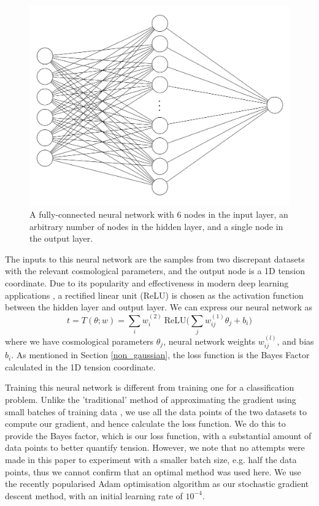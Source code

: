 \documentclass[%
 reprint,
 amsmath,amssymb,
 aps,
]{revtex4-2}
\begin{document}
\begin{figure}
    \includegraphics[width=0.8\columnwidth]{images/nn.png}
    \centering
    \caption{A fully-connected neural network with 6 nodes in the input layer, an arbitrary number of nodes in the hidden layer, and a single node in the output layer.}
    \label{fig:NN}
\end{figure}

The inputs to this neural network are the samples from two discrepant datasets with the relevant cosmological parameters, and the output node is a 1D tension coordinate. Due to its popularity and effectiveness in modern deep learning applications \cite{Nwankpa2018}, a rectified linear unit (ReLU) \cite{Nair2010} is chosen as the activation function between the hidden layer and output layer. We can express our neural network as
\begin{equation}
    t = T(\theta; w) = \sum_i w^{(2)}_i \ \textrm{ReLU} \bigg( \sum_j w^{(1)}_{ij} \theta_j + b_i \bigg)
\end{equation}
where we have cosmological parameters $\theta_{j}$, neural network weights $w^{(l)}_{ij}$, and bias $b_i$. As mentioned in Section \ref{non_gaussian}, the loss function is the Bayes Factor calculated in the 1D tension coordinate.

Training this neural network is different from training one for a classification problem. Unlike the 'traditional' method of approximating the gradient using small batches of training data \cite{Keskar2017}, we use all the data points of the two datasets to compute our gradient, and hence calculate the loss function. We do this to provide the Bayes factor, which is our loss function, with a substantial amount of data points to better quantify tension. However, we note that no attempts were made in this paper to experiment with a smaller batch size, e.g. half the data points, thus we cannot confirm that an optimal method was used here. We use the recently popularised Adam optimisation algorithm \cite{Kingma2017} as our stochastic gradient descent method, with an initial learning rate of $10^{-4}$.
\end{document}
